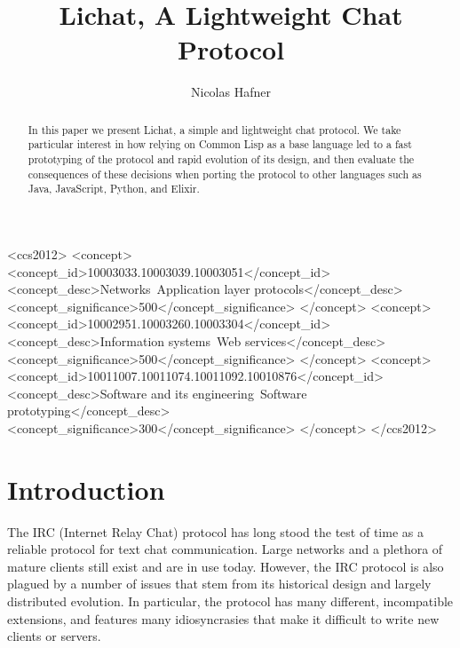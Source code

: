 \documentclass[format=sigconf]{acmart}
\begin{document}
\title{Lichat, A Lightweight Chat Protocol}

\author{Nicolas Hafner}

\begin{abstract}
  In this paper we present Lichat, a simple and lightweight chat protocol. We take particular interest in how relying on Common Lisp as a base language led to a fast prototyping of the protocol and rapid evolution of its design, and then evaluate the consequences of these decisions when porting the protocol to other languages such as Java, JavaScript, Python, and Elixir.
\end{abstract}

\begin{CCSXML}
  <ccs2012>
  <concept>
  <concept_id>10003033.10003039.10003051</concept_id>
  <concept_desc>Networks~Application layer protocols</concept_desc>
  <concept_significance>500</concept_significance>
  </concept>
  <concept>
  <concept_id>10002951.10003260.10003304</concept_id>
  <concept_desc>Information systems~Web services</concept_desc>
  <concept_significance>500</concept_significance>
  </concept>
  <concept>
  <concept_id>10011007.10011074.10011092.10010876</concept_id>
  <concept_desc>Software and its engineering~Software prototyping</concept_desc>
  <concept_significance>300</concept_significance>
  </concept>
  </ccs2012>
\end{CCSXML}



\maketitle

\newpage

\def\abovecaptionskip{1pt}
\def\listingautorefname{Listing}
\def\figureautorefname{Figure}

\section{Introduction}\label{introduction}
The IRC\cite{oikarinen1993internet} (Internet Relay Chat) protocol has long stood the test of time as a reliable protocol for text chat communication. Large networks and a plethora of mature clients still exist and are in use today. However, the IRC protocol is also plagued by a number of issues that stem from its historical design and largely distributed evolution. In particular, the protocol has many different, incompatible extensions, and features many idiosyncrasies that make it difficult to write new clients or servers.
\end{document}
